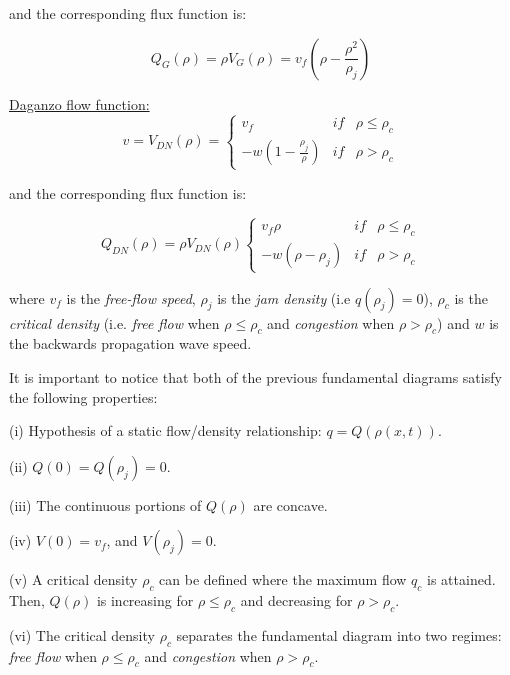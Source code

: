 \documentclass[letterpaper,10pt]{article}
\begin{document}
\noindent and the corresponding flux function is:

\begin{equation} \label{eq:greenshieldsFlux}
Q_{G}(\rho) = \rho V_{G}(\rho) = v_{f}(\rho-\frac{\rho^{2}}{\rho_{j}})
\end{equation}	

\noindent\underline{Daganzo flow function:} 
\begin{equation}\label{eq:dnVelocity}
v = V_{DN}(\rho) = \left\{ \begin{array}{lcl}
v_{f} & if & \rho \leq \rho_{c} \\
-w \left( 1 - \frac{\rho_{j}}{\rho} \right) & if & \rho > \rho_{c}
\end{array}\right.
\end{equation}

\noindent and the corresponding flux function is:

\begin{equation}\label{eq:dnFlux}
Q_{DN}(\rho) = \rho V_{DN}(\rho) \left\{ \begin{array}{lcl}
v_{f} \rho & if & \rho \leq \rho_{c} \\
-w \left( \rho - \rho_{j} \right) & if & \rho > \rho_{c}
\end{array}\right.
\end{equation}

where $v_f$ is the \textit{free-flow speed}, $\rho_j$ is the \textit{jam density} (i.e $q(\rho_j)=0$), $\rho_c$ is the \textit{critical density} (i.e. \textit{free flow} when $\rho \leq \rho_{c}$ and \textit{congestion} when $\rho > \rho_{c}$) and $w$ is the backwards propagation wave speed.

\bigskip
It is important to notice that both of the previous fundamental diagrams satisfy the following properties:

(i) Hypothesis of a static flow/density relationship: $q = Q(\rho(x,t))$.

(ii) $Q(0)=Q(\rho_{j})=0$.

(iii) The continuous portions of $Q(\rho)$ are concave.

(iv) $V(0) = v_{f}$, and $V(\rho_{j}) = 0$.

(v) A critical density $\rho_{c}$ can be defined where the maximum flow $q_{c}$ is attained. Then, $Q(\rho)$ is increasing for $\rho \leq \rho_{c}$ and decreasing for $\rho > \rho_{c}$.

(vi) The critical density $\rho_{c}$ separates the fundamental diagram into two regimes: \textit{free flow} when $\rho \leq \rho_{c}$ and \textit{congestion} when $\rho > \rho_{c}$.
\end{document}
